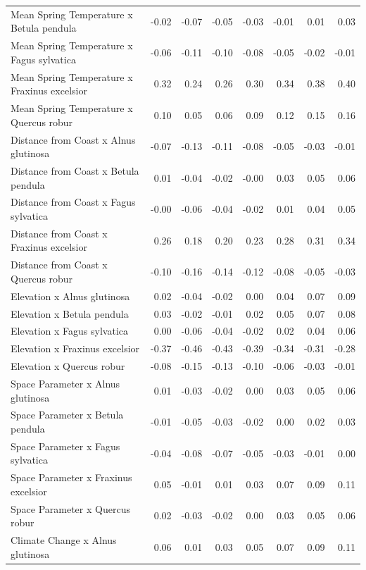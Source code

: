 \documentclass{article}\usepackage[]{graphicx}\usepackage[]{color}
\begin{document}
\begin{longtable}{lrrrrrrr}
  Mean Spring 
Temperature
x Betula pendula & -0.02 & -0.07 & -0.05 & -0.03 & -0.01 & 0.01 & 0.03 \\ 
  Mean Spring 
Temperature
x Fagus sylvatica & -0.06 & -0.11 & -0.10 & -0.08 & -0.05 & -0.02 & -0.01 \\ 
  Mean Spring 
Temperature
x Fraxinus excelsior & 0.32 & 0.24 & 0.26 & 0.30 & 0.34 & 0.38 & 0.40 \\ 
  Mean Spring 
Temperature
x Quercus robur & 0.10 & 0.05 & 0.06 & 0.09 & 0.12 & 0.15 & 0.16 \\ 
  Distance from 
Coast
x Alnus glutinosa & -0.07 & -0.13 & -0.11 & -0.08 & -0.05 & -0.03 & -0.01 \\ 
  Distance from 
Coast
x Betula pendula & 0.01 & -0.04 & -0.02 & -0.00 & 0.03 & 0.05 & 0.06 \\ 
  Distance from 
Coast
x Fagus sylvatica & -0.00 & -0.06 & -0.04 & -0.02 & 0.01 & 0.04 & 0.05 \\ 
  Distance from 
Coast
x Fraxinus excelsior & 0.26 & 0.18 & 0.20 & 0.23 & 0.28 & 0.31 & 0.34 \\ 
  Distance from 
Coast
x Quercus robur & -0.10 & -0.16 & -0.14 & -0.12 & -0.08 & -0.05 & -0.03 \\ 
  Elevation
x Alnus glutinosa & 0.02 & -0.04 & -0.02 & 0.00 & 0.04 & 0.07 & 0.09 \\ 
  Elevation
x Betula pendula & 0.03 & -0.02 & -0.01 & 0.02 & 0.05 & 0.07 & 0.08 \\ 
  Elevation
x Fagus sylvatica & 0.00 & -0.06 & -0.04 & -0.02 & 0.02 & 0.04 & 0.06 \\ 
  Elevation
x Fraxinus excelsior & -0.37 & -0.46 & -0.43 & -0.39 & -0.34 & -0.31 & -0.28 \\ 
  Elevation
x Quercus robur & -0.08 & -0.15 & -0.13 & -0.10 & -0.06 & -0.03 & -0.01 \\ 
  Space Parameter
x Alnus glutinosa & 0.01 & -0.03 & -0.02 & 0.00 & 0.03 & 0.05 & 0.06 \\ 
  Space Parameter
x Betula pendula & -0.01 & -0.05 & -0.03 & -0.02 & 0.00 & 0.02 & 0.03 \\ 
  Space Parameter
x Fagus sylvatica & -0.04 & -0.08 & -0.07 & -0.05 & -0.03 & -0.01 & 0.00 \\ 
  Space Parameter
x Fraxinus excelsior & 0.05 & -0.01 & 0.01 & 0.03 & 0.07 & 0.09 & 0.11 \\ 
  Space Parameter
x Quercus robur & 0.02 & -0.03 & -0.02 & 0.00 & 0.03 & 0.05 & 0.06 \\ 
  Climate Change
x Alnus glutinosa & 0.06 & 0.01 & 0.03 & 0.05 & 0.07 & 0.09 & 0.11 \\ 

\end{longtable}
\end{document}
